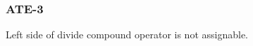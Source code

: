 \subsubsection{ATE-3}\label{sec:error_code_ate_3}

Left side of divide compound operator is not assignable.


